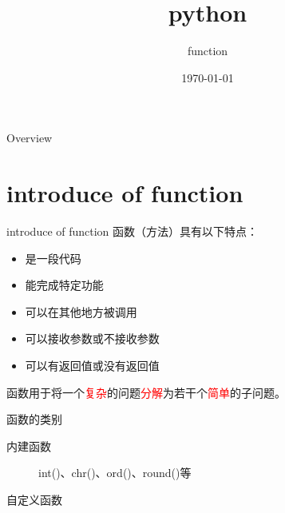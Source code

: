 \documentclass{beamer}
\title[Django]{python} %
\subtitle{function}
\author{} %
\institute[计算机科学与技术学院] %
{
贵州大学 \\ %
\medskip
\textit{hnzhang1@gzu.edu.cn} %
}
\date{\today} %
\begin{document}
\begin{frame}
\titlepage %
\end{frame}
\begin{frame}{Overview}
\tableofcontents
\end{frame}




\section{introduce of function}
\begin{frame}{introduce of function}
函数（方法）具有以下特点：
\begin{itemize}
\item 是一段代码
\item 能完成特定功能
\item 可以在其他地方被调用
\item 可以接收参数或不接收参数
\item 可以有返回值或没有返回值
\end{itemize}
函数用于将一个\textcolor{red}{复杂}的问题\textcolor{red}{分解}为若干个\textcolor{red}{简单}的子问题。
\end{frame}
\begin{frame}{函数的类别}
\begin{description}
\item[ 内建函数 ]  int()、chr()、ord()、round()等
\item[ 自定义函数 ] 
\end{description}

\end{frame}
\end{document}
